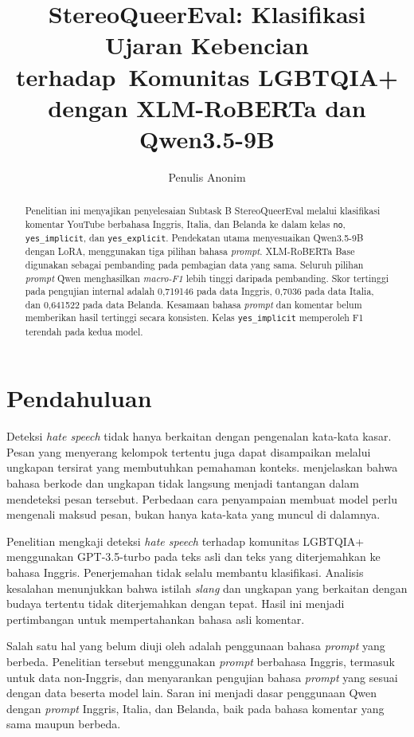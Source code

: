 \documentclass[11pt]{article}
\title{StereoQueerEval: Klasifikasi Ujaran Kebencian terhadap\
Komunitas LGBTQIA+ dengan XLM-RoBERTa dan Qwen3.5-9B}
\author{Penulis Anonim}
\begin{document}
\nolinenumbers
\raggedbottom
\maketitle
\begin{abstract}
Penelitian ini menyajikan penyelesaian Subtask B StereoQueerEval melalui klasifikasi komentar YouTube berbahasa Inggris, Italia, dan Belanda ke dalam kelas \texttt{no}, \texttt{yes\_implicit}, dan \texttt{yes\_explicit}. Pendekatan utama menyesuaikan Qwen3.5-9B dengan LoRA, menggunakan tiga pilihan bahasa \textit{prompt}. XLM-RoBERTa Base digunakan sebagai pembanding pada pembagian data yang sama. Seluruh pilihan \textit{prompt} Qwen menghasilkan \textit{macro-F1} lebih tinggi daripada pembanding. Skor tertinggi pada pengujian internal adalah 0,719146 pada data Inggris, 0,7036 pada data Italia, dan 0,641522 pada data Belanda. Kesamaan bahasa \textit{prompt} dan komentar belum memberikan hasil tertinggi secara konsisten. Kelas \texttt{yes\_implicit} memperoleh F1 terendah pada kedua model.
\end{abstract}

\section{Pendahuluan}
Deteksi \textit{hate speech} tidak hanya berkaitan dengan pengenalan kata-kata kasar. Pesan yang menyerang kelompok tertentu juga dapat disampaikan melalui ungkapan tersirat yang membutuhkan pemahaman konteks. \citet{elsherief-etal-2021-latent} menjelaskan bahwa bahasa berkode dan ungkapan tidak langsung menjadi tantangan dalam mendeteksi pesan tersebut. Perbedaan cara penyampaian membuat model perlu mengenali maksud pesan, bukan hanya kata-kata yang muncul di dalamnya.

Penelitian \citet{chan-etal-2024-hate} mengkaji deteksi \textit{hate speech} terhadap komunitas LGBTQIA+ menggunakan GPT-3.5-turbo pada teks asli dan teks yang diterjemahkan ke bahasa Inggris. Penerjemahan tidak selalu membantu klasifikasi. Analisis kesalahan menunjukkan bahwa istilah \textit{slang} dan ungkapan yang berkaitan dengan budaya tertentu tidak diterjemahkan dengan tepat. Hasil ini menjadi pertimbangan untuk mempertahankan bahasa asli komentar.

Salah satu hal yang belum diuji oleh \citet{chan-etal-2024-hate} adalah penggunaan bahasa \textit{prompt} yang berbeda. Penelitian tersebut menggunakan \textit{prompt} berbahasa Inggris, termasuk untuk data non-Inggris, dan menyarankan pengujian bahasa \textit{prompt} yang sesuai dengan data beserta model lain. Saran ini menjadi dasar penggunaan Qwen dengan \textit{prompt} Inggris, Italia, dan Belanda, baik pada bahasa komentar yang sama maupun berbeda.
\end{document}
